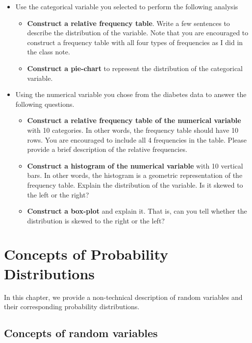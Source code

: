 \documentclass[
]{book}
\providecommand{\tightlist}{%
  \setlength{\itemsep}{0pt}\setlength{\parskip}{0pt}}
\begin{document}
\begin{itemize}
\item
  Use the categorical variable you selected to perform the following analysis

  \begin{itemize}
  \tightlist
  \item
    \textbf{Construct a relative frequency table}. Write a few sentences to describe the distribution of the variable. Note that you are encouraged to construct a frequency table with all four types of frequencies as I did in the class note.
  \item
    \textbf{Construct a pie-chart} to represent the distribution of the categorical variable.
  \end{itemize}
\item
  Using the numerical variable you chose from the diabetes data to answer the following questions.

  \begin{itemize}
  \tightlist
  \item
    \textbf{Construct a relative frequency table of the numerical variable} with 10 categories. In other words, the frequency table should have 10 rows. You are encouraged to include all 4 frequencies in the table. Please provide a brief description of the relative frequencies.
  \item
    \textbf{Construct a histogram of the numerical variable} with 10 vertical bars. In other words, the histogram is a geometric representation of the frequency table. Explain the distribution of the variable. Is it skewed to the left or the right?
  \item
    \textbf{Construct a box-plot} and explain it. That is, can you tell whether the distribution is skewed to the right or the left?
  \end{itemize}
\end{itemize}

\hypertarget{concepts-of-probability-distributions}{%
\chapter{Concepts of Probability Distributions}\label{concepts-of-probability-distributions}}

In this chapter, we provide a non-technical description of random variables and their corresponding probability distributions.

\hypertarget{concepts-of-random-variables}{%
\section{Concepts of random variables}\label{concepts-of-random-variables}}
\end{document}
